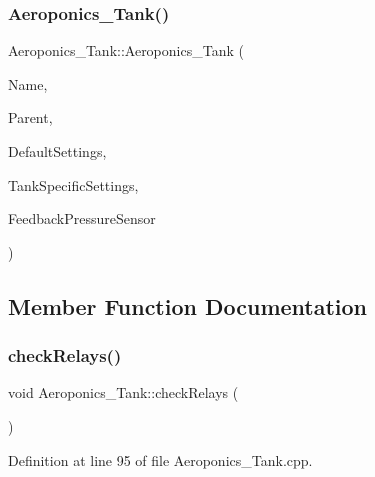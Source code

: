 \subsubsection{\texorpdfstring{Aeroponics\+\_\+\+Tank()}{Aeroponics\_Tank()}\hspace{0.1cm}{\footnotesize\ttfamily [2/2]}}
{\footnotesize\ttfamily Aeroponics\+\_\+\+Tank\+::\+Aeroponics\+\_\+\+Tank (\begin{DoxyParamCaption}\item[{const \+\_\+\+\_\+\+Flash\+String\+Helper $\ast$}]{Name,  }\item[{\hyperlink{class_module}{Module} $\ast$}]{Parent,  }\item[{\hyperlink{struct_settings_1_1_aeroponics_settings}{Settings\+::\+Aeroponics\+Settings} $\ast$}]{Default\+Settings,  }\item[{\hyperlink{struct_settings_1_1_aeroponics_settings___tank_specific}{Settings\+::\+Aeroponics\+Settings\+\_\+\+Tank\+Specific} $\ast$}]{Tank\+Specific\+Settings,  }\item[{\hyperlink{class_pressure_sensor}{Pressure\+Sensor} $\ast$}]{Feedback\+Pressure\+Sensor }\end{DoxyParamCaption})}



\subsection{Member Function Documentation}
\mbox{\label{class_aeroponics___tank_a4ee215af07d5ee08e2b12efc9a7e1db9}} 
\subsubsection{\texorpdfstring{check\+Relays()}{checkRelays()}\hspace{0.1cm}{\footnotesize\ttfamily [1/2]}}
{\footnotesize\ttfamily void Aeroponics\+\_\+\+Tank\+::check\+Relays (\begin{DoxyParamCaption}{ }\end{DoxyParamCaption})\hspace{0.3cm}{\ttfamily [protected]}}



Definition at line 95 of file Aeroponics\+\_\+\+Tank.\+cpp.

